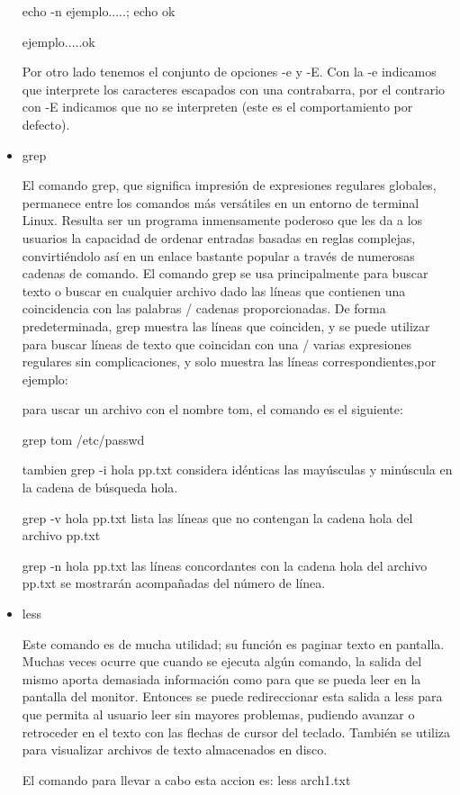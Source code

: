 \documentclass{article}
\begin{document}
\begin{itemize}
echo -n ejemplo.....; echo ok

ejemplo.....ok


Por otro lado tenemos el conjunto de opciones -e y -E. Con la -e indicamos que interprete los caracteres escapados con una contrabarra, por el contrario con -E indicamos que no se interpreten (este es el comportamiento por defecto).


\item{grep}

El comando grep, que significa impresión de expresiones regulares globales, permanece entre los comandos más versátiles en un entorno de terminal Linux. Resulta ser un programa inmensamente poderoso que les da a los usuarios la capacidad de ordenar entradas basadas en reglas complejas, convirtiéndolo así en un enlace bastante popular a través de numerosas cadenas de comando. El comando grep se usa principalmente para buscar texto o buscar en cualquier archivo dado las líneas que contienen una coincidencia con las palabras / cadenas proporcionadas. De forma predeterminada, grep muestra las líneas que coinciden, y se puede utilizar para buscar líneas de texto que coincidan con una / varias expresiones regulares sin complicaciones, y solo muestra las líneas correspondientes,por ejemplo:


para uscar un archivo con el nombre tom, el comando es el siguiente:

grep tom /etc/passwd

tambien grep -i hola pp.txt considera idénticas las mayúsculas y minúscula en la cadena de búsqueda hola.

grep -v hola pp.txt lista las líneas que no contengan la cadena hola del archivo pp.txt

grep -n hola pp.txt las líneas concordantes con la cadena hola del archivo pp.txt se mostrarán acompañadas del número de línea.


\item{less}

Este comando es de mucha utilidad; su función es paginar texto en pantalla. Muchas veces ocurre que cuando se ejecuta algún comando, la salida del mismo aporta demasiada información como para que se pueda leer en la pantalla del monitor. Entonces se puede redireccionar esta salida a less para que permita al usuario leer sin mayores problemas, pudiendo avanzar o retroceder en el texto con las flechas de cursor del teclado. También se utiliza para visualizar archivos de texto almacenados en disco.

El comando para llevar a cabo esta accion es:
less arch1.txt


\end{itemize}
\end{document}
